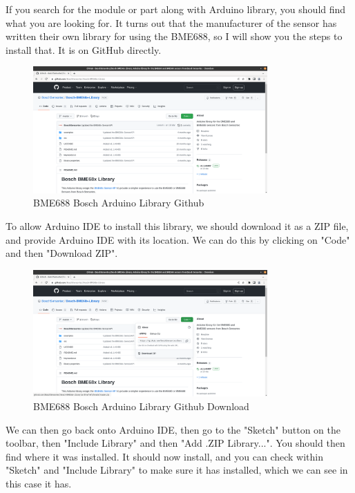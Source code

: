 \documentclass[a4paper,11pt]{report}
\begin{document}
If you search for the module or part along with Arduino library, you should find what you are looking for. It turns out that the manufacturer of the sensor has written their own library for using the BME688, so I will show you the steps to install that. It is on GitHub directly.

\begin{figure}[H]
\centering
\includegraphics[width=0.8\textwidth]{screenshots/boscharduinolibrarygithub}
\caption{BME688 Bosch Arduino Library Github}
\end{figure}

To allow Arduino IDE to install this library, we should download it as a ZIP file, and provide Arduino IDE with its location. We can do this by clicking on "Code" and then "Download ZIP".

\begin{figure}[H]
\centering
\includegraphics[width=0.8\textwidth]{screenshots/boscharduinolibrarygithubdownload}
\caption{BME688 Bosch Arduino Library Github Download}
\end{figure}

We can then go back onto Arduino IDE, then go to the "Sketch" button on the toolbar, then "Include Library" and then "Add .ZIP Library...". You should then find where it was installed. It should now install, and you can check within "Sketch" and "Include Library" to make sure it has installed, which we can see in this case it has.
\end{document}

